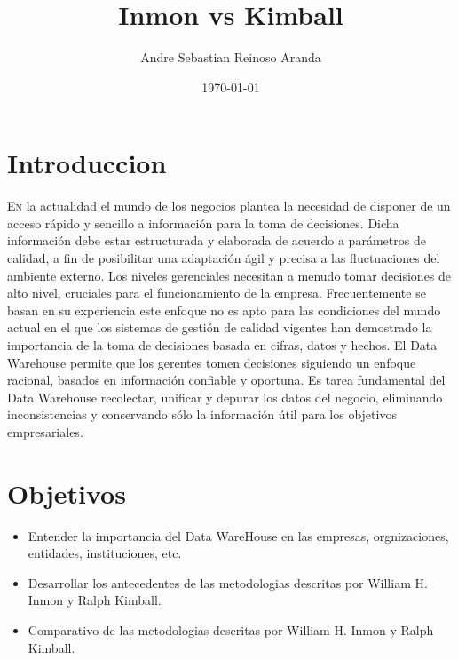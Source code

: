 \documentclass[twoside,twocolumn]{article}
\title{Inmon vs Kimball}
\author{Andre Sebastian Reinoso Aranda\\
}
\date{\today}
\begin{document}
\maketitle


\section{Introduccion}
\lettrine[nindent=0em,lines=3]{E}n la actualidad el mundo de los negocios plantea la necesidad de disponer de un acceso rápido y sencillo a información para la toma de decisiones. Dicha información debe estar estructurada y elaborada de acuerdo a parámetros de calidad, a fin de posibilitar una adaptación ágil y precisa a las fluctuaciones del ambiente externo.
Los niveles gerenciales necesitan a menudo tomar decisiones de alto nivel, cruciales para el funcionamiento de la empresa. Frecuentemente se basan en su experiencia este enfoque no es apto para las condiciones del mundo actual en el que los sistemas de gestión de calidad vigentes han demostrado la importancia de la toma de decisiones basada en cifras, datos y hechos. El Data Warehouse permite que los gerentes tomen decisiones siguiendo un enfoque racional, basados en información confiable y oportuna. Es tarea fundamental del Data Warehouse recolectar, unificar y depurar los datos del negocio, eliminando inconsistencias y conservando sólo la información útil para los objetivos empresariales.





\section{Objetivos}

\begin{itemize}
\item Entender la importancia del Data WareHouse en las empresas, orgnizaciones, entidades, instituciones, etc.
\item Desarrollar los antecedentes de las metodologias descritas por William H. Inmon y Ralph Kimball.
\item Comparativo de las metodologias descritas por William H. Inmon y Ralph Kimball.

\end{itemize}
\end{document}
